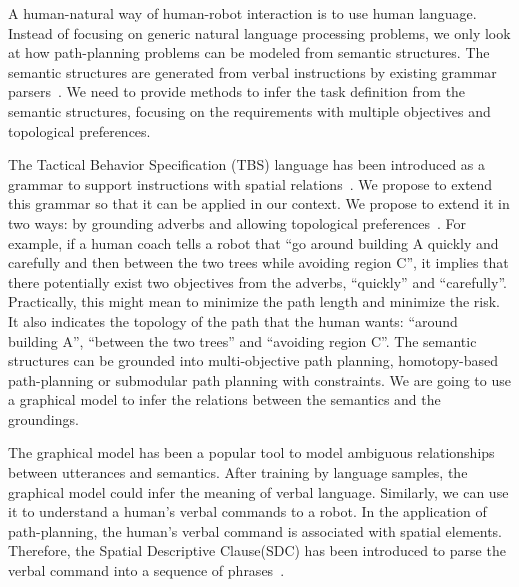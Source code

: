 \documentclass[phd]{byuprop}
\begin{document}
A human-natural way of human-robot interaction is to use human language.
Instead of focusing on generic natural language processing problems, we only look at how path-planning problems can be modeled from semantic structures.
The semantic structures are generated from verbal instructions by existing grammar parsers~\cite{Kollar:2010:TUN:1734454.1734553}.
We need to provide methods to infer the task definition from the semantic structures, focusing on the requirements with multiple objectives and topological preferences.

The Tactical Behavior Specification (TBS) language has been introduced as a grammar to support instructions with spatial relations~\cite{Boularias_2015_7953}.
We propose to extend this grammar so that it can be applied in our context.
We propose to extend it in two ways: by grounding adverbs and allowing topological preferences~\cite{Yi2014}.
For example, if a human coach tells a robot that ``go around building A quickly and carefully and then between the two trees while avoiding region C'',
it implies that there potentially exist two objectives from the adverbs, ``quickly'' and ``carefully''.
Practically, this might mean to minimize the path length and minimize the risk.
It also indicates the topology of the path that the human wants: ``around building A'', ``between the two trees'' and ``avoiding region C''.
The semantic structures can be grounded into multi-objective path planning, homotopy-based path-planning or submodular path planning with constraints.
We are going to use a graphical model to infer the relations between the semantics and the groundings.

The graphical model has been a popular tool to model ambiguous relationships between utterances and semantics.
After training by language samples, the graphical model could infer the meaning of verbal language.
Similarly, we can use it to understand a human's verbal commands to a robot.
In the application of path-planning, the human's verbal command is associated with spatial elements. 
Therefore, the Spatial Descriptive Clause(SDC) has been introduced to parse the verbal command into a sequence of phrases~\cite{Kollar:2010:TUN:1734454.1734553}.
\end{document}
